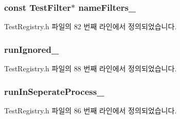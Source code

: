 \subsubsection[{\texorpdfstring{name\+Filters\+\_\+}{nameFilters_}}]{\setlength{\rightskip}{0pt plus 5cm}const {\bf Test\+Filter}$\ast$ name\+Filters\+\_\+\hspace{0.3cm}{\ttfamily [private]}}\hypertarget{class_test_registry_adceace73e87d3103509368cc7724c9dd}{}\label{class_test_registry_adceace73e87d3103509368cc7724c9dd}


Test\+Registry.\+h 파일의 82 번째 라인에서 정의되었습니다.

\subsubsection[{\texorpdfstring{run\+Ignored\+\_\+}{runIgnored_}}]{ run\+Ignored\+\_\+\hspace{0.3cm}{\ttfamily [private]}}\hypertarget{class_test_registry_a9aedd4f11eb25d8bd013c2463fccfea6}{}\label{class_test_registry_a9aedd4f11eb25d8bd013c2463fccfea6}


Test\+Registry.\+h 파일의 88 번째 라인에서 정의되었습니다.

\subsubsection[{\texorpdfstring{run\+In\+Seperate\+Process\+\_\+}{runInSeperateProcess_}}]{ run\+In\+Seperate\+Process\+\_\+\hspace{0.3cm}{\ttfamily [private]}}\hypertarget{class_test_registry_afa76b0521126a402ac5587199151acd5}{}\label{class_test_registry_afa76b0521126a402ac5587199151acd5}


Test\+Registry.\+h 파일의 86 번째 라인에서 정의되었습니다.

